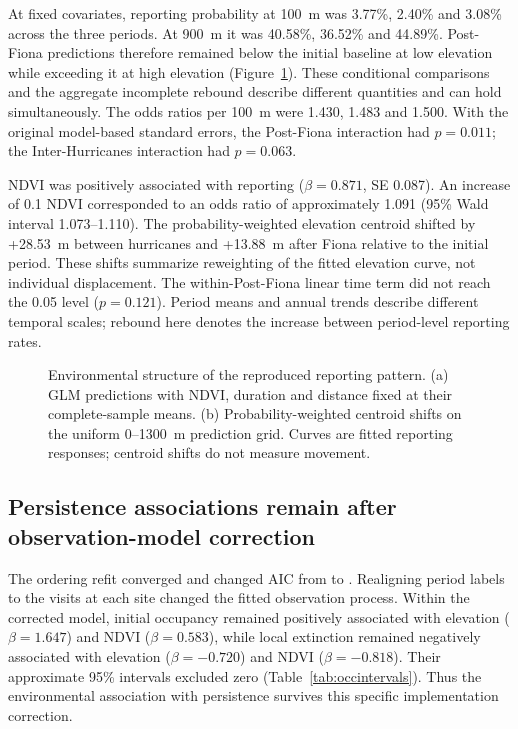 At fixed covariates, reporting probability at 100~m was 3.77\%, 2.40\% and 3.08\% across the three periods. At 900~m it was 40.58\%, 36.52\% and 44.89\%. Post-Fiona predictions therefore remained below the initial baseline at low elevation while exceeding it at high elevation (Figure~\ref{fig:gradients}). These conditional comparisons and the aggregate incomplete rebound describe different quantities and can hold simultaneously. The odds ratios per 100~m were 1.430, 1.483 and 1.500. With the original model-based standard errors, the Post-Fiona interaction had $p=0.011$; the Inter-Hurricanes interaction had $p=0.063$.

NDVI was positively associated with reporting ($\beta=0.871$, SE 0.087). An increase of 0.1 NDVI corresponded to an odds ratio of approximately 1.091 (95\% Wald interval 1.073--1.110). The probability-weighted elevation centroid shifted by +28.53~m between hurricanes and +13.88~m after Fiona relative to the initial period. These shifts summarize reweighting of the fitted elevation curve, not individual displacement. The within-Post-Fiona linear time term did not reach the 0.05 level ($p=0.121$). Period means and annual trends describe different temporal scales; rebound here denotes the increase between period-level reporting rates.
\begin{figure}[htbp]\centering
{}
\caption{Environmental structure of the reproduced reporting pattern. (a) GLM predictions with NDVI, duration and distance fixed at their complete-sample means. (b) Probability-weighted centroid shifts on the uniform 0--1300~m prediction grid. Curves are fitted reporting responses; centroid shifts do not measure movement.}\label{fig:gradients}
\end{figure}
\FloatBarrier



\subsection{Persistence associations remain after observation-model correction}
The ordering refit converged and changed AIC from \aicOccPub{} to \aicOccFix{}. Realigning period labels to the visits at each site changed the fitted observation process. Within the corrected model, initial occupancy remained positively associated with elevation ($\beta=1.647$) and NDVI ($\beta=0.583$), while local extinction remained negatively associated with elevation ($\beta=-0.720$) and NDVI ($\beta=-0.818$). Their approximate 95\% intervals excluded zero (Table~\ref{tab:occintervals}). Thus the environmental association with persistence survives this specific implementation correction.

